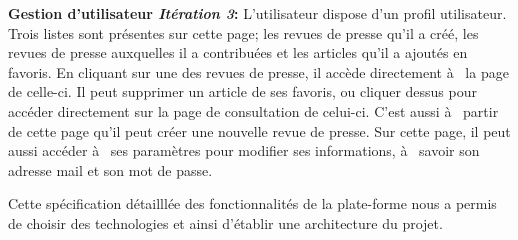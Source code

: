 	\textbf{Gestion d'utilisateur \textit{Itération 3}:} L'utilisateur dispose d'un profil utilisateur. Trois listes sont présentes sur cette page; les revues de presse qu'il a créé, les revues de presse auxquelles il a contribuées et les articles qu'il a ajoutés en favoris. En cliquant sur une des revues de presse, il accède directement à  la page de celle-ci. Il peut supprimer un article de ses favoris, ou cliquer dessus pour accéder directement sur la page de consultation de celui-ci. C'est aussi à  partir de cette page qu'il peut créer une nouvelle revue de presse. Sur cette page, il peut aussi accéder à  ses paramètres pour modifier ses informations, à  savoir son adresse mail et son mot de passe.

Cette spécification détailllée des fonctionnalités de la plate-forme nous a permis de choisir des technologies et ainsi d'établir une architecture du projet.
